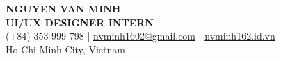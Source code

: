 \begin{center}
    {\fontsize{25}{28}\selectfont\bfseries NGUYEN VAN MINH}\\[4pt]
    {\large\bfseries UI/UX DESIGNER INTERN}\\[6pt]
    (+84) 353 999 798 \;|\; \href{mailto:nvminh1602@gmail.com}{nvminh1602@gmail.com} \;|\; \href{https://nvminh162.id.vn}{nvminh162.id.vn}\\[3pt]
    Ho Chi Minh City, Vietnam
    \\ \vspace{-1pt}
\end{center}
